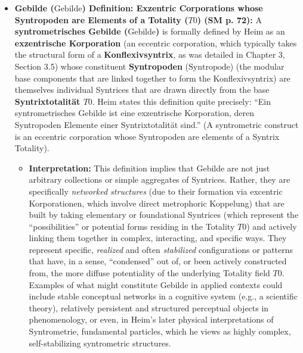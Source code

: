 \documentclass[12pt]{article}
\newcommand{\q}[1]{\enquote{#1}}
\newcommand{\syntropode}{\text{Syntropode}}
\newcommand{\syntrixtotalitaet}{T0}
\newcommand{\syntrometrischesGebilde}{\text{Gebilde}}
\begin{document}
\begin{itemize}
    \item \textbf{Gebilde (\(\syntrometrischesGebilde\)) Definition: Exzentric Corporations whose Syntropoden are Elements of a Totality (\(\syntrixtotalitaet\)) (SM p. 72):}
    A \textbf{syntrometrisches Gebilde (\(\syntrometrischesGebilde\))} is formally defined by Heim as an \textbf{exzentrische Korporation} (an eccentric corporation, which typically takes the structural form of a \textbf{Konflexivsyntrix}, as was detailed in Chapter 3, Section 3.5) whose constituent \textbf{Syntropoden} (\(\syntropode\)) (the modular base components that are linked together to form the Konflexivsyntrix) are themselves individual Syntrices that are drawn directly from the base \textbf{Syntrixtotalität \( \syntrixtotalitaet \)}.
    Heim states this definition quite precisely: \q{Ein syntrometrisches Gebilde ist eine exzentrische Korporation, deren Syntropoden Elemente einer Syntrixtotalität sind.} (A syntrometric construct is an eccentric corporation whose Syntropoden are elements of a Syntrix Totality).
    \begin{itemize}
        \item \textbf{Interpretation:} This definition implies that Gebilde are not just arbitrary collections or simple aggregates of Syntrices. Rather, they are specifically \textit{networked structures} (due to their formation via excentric Korporationen, which involve direct metrophoric Koppelung) that are built by taking elementary or foundational Syntrices (which represent the \q{possibilities} or potential forms residing in the Totality \( \syntrixtotalitaet \)) and actively linking them together in complex, interacting, and specific ways. They represent specific, \textit{realized} and often \textit{stabilized} configurations or patterns that have, in a sense, \q{condensed} out of, or been actively constructed from, the more diffuse potentiality of the underlying Totality field \( \syntrixtotalitaet \). Examples of what might constitute Gebilde in applied contexts could include stable conceptual networks in a cognitive system (e.g., a scientific theory), relatively persistent and structured perceptual objects in phenomenology, or even, in Heim's later physical interpretations of Syntrometrie, fundamental particles, which he views as highly complex, self-stabilizing syntrometric structures.
    \end{itemize}


\end{itemize}
\end{document}
